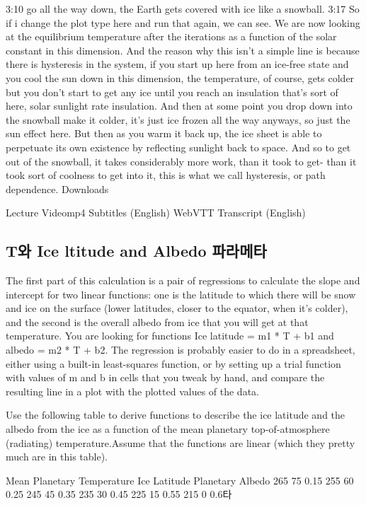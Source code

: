 {3:10
go all the way down, the Earth gets covered with ice like a snowball. 
3:17
So if i change the plot type here and run that again, we can see. We are now looking at the equilibrium temperature after the iterations as a function of the solar constant in this dimension. And the reason why this isn't a simple line is because there is hysteresis in the system, if you start up here from an ice-free state and you cool the sun down in this dimension, the temperature, of course, gets colder but you don't start to get any ice until you reach an insulation that's sort of here, solar sunlight rate insulation. And then at some point you drop down into the snowball make it colder, it's just ice frozen all the way anyways, so just the sun effect here. But then as you warm it back up, the ice sheet is able to perpetuate its own existence by reflecting sunlight back to space. And so to get out of the snowball, it takes considerably more work, than it took to get- than it took sort of coolness to get into it, this is what we call hysteresis, or path dependence. 
Downloads

Lecture Videomp4
Subtitles (English)
WebVTT
Transcript (English)


\subsection{T와 Ice ltitude and Albedo 파라메타}\index{}

The first part of this calculation is a pair of regressions to calculate the slope and intercept for two linear functions: one is the latitude to which there will be snow and ice on the surface (lower latitudes, closer to the equator, when it’s colder), and the second is the overall albedo from ice that you will get at that temperature. You are looking for functions Ice latitude = m1 * T + b1 and albedo = m2 * T + b2. The regression is probably easier to do in a spreadsheet, either using a built-in least-squares function, or by setting up a trial function with values of m and b in cells that you tweak by hand, and compare the resulting line in a plot with the plotted values of the data.

Use the following table to derive functions to describe the ice latitude and the albedo from the ice as a function of the mean planetary top-of-atmosphere (radiating) temperature.Assume that the functions are linear (which they pretty much are in this table).

Mean Planetary Temperature	Ice Latitude	Planetary Albedo
265	75	0.15
255	60	0.25
245	45	0.35
235	30	0.45
225	15	0.55
215	0	0.6타

}
